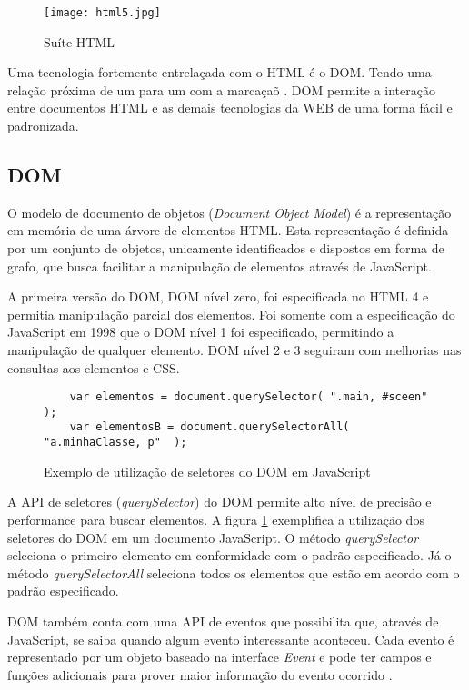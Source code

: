 \begin{figure}[H]
    \centering
    \texttt{[image: html5.jpg]}
    \caption{Suíte HTML}
\end{figure}

Uma tecnologia fortemente entrelaçada com o HTML é o DOM.
Tendo uma relação próxima de um para um com a marcaçaõ
\autocite{howBrowsersWork}. DOM permite a interação entre documentos
HTML e as demais tecnologias da WEB de uma forma fácil e padronizada.

\subsection{DOM}

O modelo de documento de objetos (\textit{Document Object Model}) é
a representação em memória de uma árvore de elementos HTML. Esta
representação é definida por um conjunto de objetos, unicamente
identificados e dispostos em forma de grafo, que busca facilitar a
manipulação de elementos através de JavaScript.

A primeira versão do DOM, DOM nível zero, foi especificada no
HTML 4 e permitia manipulação parcial dos elementos. Foi somente
com a especificação do JavaScript em 1998 que o DOM nível 1 foi
especificado, permitindo a manipulação de qualquer elemento. DOM
nível 2 e 3 seguiram com melhorias nas consultas aos elementos e CSS.

\begin{figure}[H]
\centering
\begin{verbatim}
    var elementos = document.querySelector( ".main, #sceen"  );
    var elementosB = document.querySelectorAll( "a.minhaClasse, p"  );
\end{verbatim}
\caption{Exemplo de utilização de seletores do DOM em JavaScript}
\label{fig:selectorsSample}
\end{figure}

A API de seletores (\textit{querySelector}) do DOM permite alto
nível de precisão e performance para buscar elementos. A figura
\ref{fig:selectorsSample} exemplifica a utilização dos seletores
do DOM em um documento JavaScript. O método \textit{querySelector}
seleciona o primeiro elemento em conformidade com o padrão
especificado. Já o método \textit{querySelectorAll} seleciona todos os
elementos que estão em acordo com o padrão especificado.

DOM também conta com uma API de eventos que possibilita que, através
de JavaScript, se saiba quando algum evento interessante aconteceu.
Cada evento é representado por um objeto baseado na interface
\textit{Event} e pode ter campos e funções adicionais para prover
maior informação do evento ocorrido \autocite{devdocs}.

